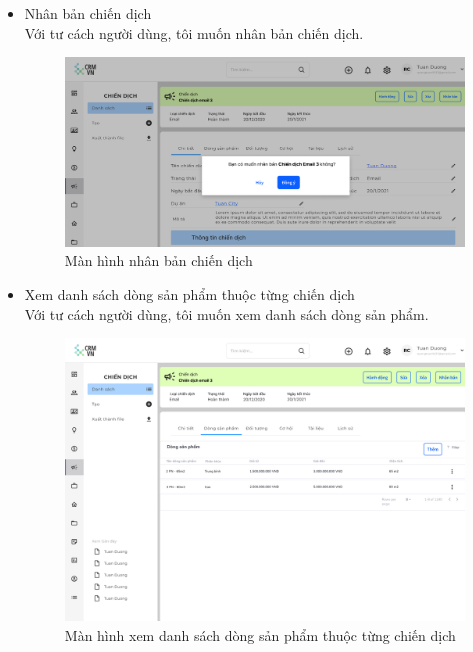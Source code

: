 \documentclass[12pt,a4paper]{article}
\begin{document}
\begin{enumerate}
\begin{itemize}
            \item Nhân bản chiến dịch \\
            Với tư cách người dùng, tôi muốn nhân bản chiến dịch.

            \begin{figure}[H]
                \centering \includegraphics[width=\textwidth]{Img/Nguyet/Chiendich/nhanbancd.png}
                \vspace{0.5cm}
                \caption{Màn hình nhân bản chiến dịch }
                \label{nhanbanchiendich}
            \end{figure}

            \item Xem danh sách dòng sản phẩm thuộc từng chiến dịch \\
            Với tư cách người dùng, tôi muốn xem danh sách dòng sản phẩm.

            \begin{figure}[H]
                \centering \includegraphics[width=\textwidth]{Img/Nguyet/Chiendich/dsdongsp.png}
                \vspace{0.5cm}
                \caption{Màn hình xem danh sách dòng sản phẩm thuộc từng chiến dịch }
                \label{dongspchiendich}
            \end{figure}


\end{itemize}
\end{enumerate}
\end{document}
